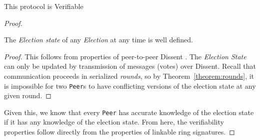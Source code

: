 \begin{theorem} This protocol is Verifiable\end{theorem}

\begin{proof}

  \begin{lemma}The \emph{Election state} of any \emph{Election} at
  any time is well defined. \end{lemma}
  \begin{proof}This follows from properties of peer-to-peer Dissent \cite{sec}.
    The \emph{Election State} can only be updated by transmission of messages
    (votes) over Dissent. Recall that communication proceeds in serialized
    \emph{rounds}, so by Theorem~\ref{theorem:rounds}, it is impossible for two
    \texttt{Peer}s to have conflicting versions of the election state at any
    given round.
  \end{proof}

  Given this, we know that every \texttt{Peer} has accurate knowledge of the
  election state if it has any knowledge of the election state. From here, the
  verifiability properties follow directly from the properties of linkable ring
  signatures.


\end{proof}
